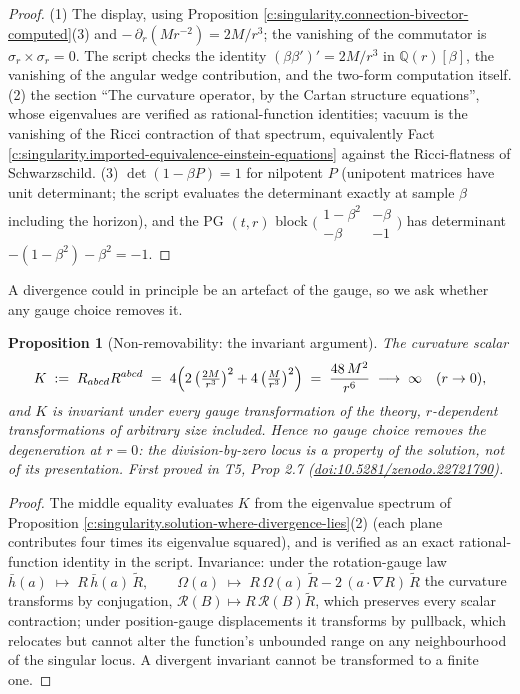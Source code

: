 \documentclass[11pt]{article}
\newtheorem{proposition}[theorem]{Proposition}
\theoremstyle{definition}
\theoremstyle{plain}
\providecommand{\hb}{}\renewcommand{\hb}{\bar{h}}
\begin{document}
\begin{proof}
(1) The display, using Proposition \ref{c:singularity.connection-bivector-computed}(3) and $-\,\partial_r(Mr^{-2}) = 2M/r^3$; the vanishing of the commutator is $\sigma_r \times \sigma_r = 0$. The script checks the identity $(\beta\beta')' = 2M/r^3$ in $\mathbb{Q}(r)[\beta]$, the vanishing of the angular wedge contribution, and the two-form computation itself. (2) the section ``The curvature operator, by the Cartan structure equations'', whose eigenvalues are verified as rational-function identities; vacuum is the vanishing of the Ricci contraction of that spectrum, equivalently Fact \ref{c:singularity.imported-equivalence-einstein-equations} against the Ricci-flatness of Schwarzschild. (3) $\det(1 - \beta P) = 1$ for nilpotent $P$ (unipotent matrices have unit determinant; the script evaluates the determinant exactly at sample $\beta$ including the horizon), and the PG $(t,r)$ block $\bigl(\begin{smallmatrix} 1-\beta^2 & -\beta \\ -\beta & -1 \end{smallmatrix}\bigr)$ has determinant $-(1-\beta^2) - \beta^2 = -1$.

\end{proof}

A divergence could in principle be an artefact of the gauge, so we ask whether any gauge choice removes it.

\begin{proposition}[Non-removability: the invariant argument]\label{c:singularity.non-removability-invariant-argument}
The curvature scalar
\[
K \;:=\; R_{abcd}R^{abcd} \;=\; 4\Bigl(2\,\bigl(\tfrac{2M}{r^3}\bigr)^2 + 4\,\bigl(\tfrac{M}{r^3}\bigr)^2\Bigr) \;=\; \frac{48\,M^2}{r^6}
\;\longrightarrow\; \infty \quad (r \to 0),
\]
and $K$ is invariant under every gauge transformation of the theory, $r$-dependent transformations of arbitrary size included. Hence no gauge choice removes the degeneration at $r = 0$: the division-by-zero locus is a property of the solution, not of its presentation.
\emph{First proved in} T5, Prop 2.7 (\href{https://doi.org/10.5281/zenodo.22721790}{doi:10.5281/zenodo.22721790}).
\end{proposition}
\begin{proof}
The middle equality evaluates $K$ from the eigenvalue spectrum of Proposition \ref{c:singularity.solution-where-divergence-lies}(2) (each plane contributes four times its eigenvalue squared), and is verified as an exact rational-function identity in the script. Invariance: under the rotation-gauge law $\hb(a) \;\mapsto\; R\,\hb(a)\,\tilde R, \qquad \Omega(a) \;\mapsto\; R\,\Omega(a)\,\tilde R - 2\,(a\cdot\nabla R)\,\tilde R$ the curvature transforms by conjugation, $\mathcal{R}(B) \mapsto R\,\mathcal{R}(B)\tilde R$, which preserves every scalar contraction; under position-gauge displacements it transforms by pullback, which relocates but cannot alter the function's unbounded range on any neighbourhood of the singular locus. A divergent invariant cannot be transformed to a finite one.

\end{proof}
\end{document}
